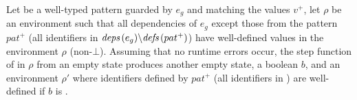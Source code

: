 \begin{lemma}
    \label{lem:semantics:grsync:theorems:productivity:patterns}
    Let  be a well-typed \GRSync pattern guarded by $e_g$ and matching the
    values $v^+$, let $\rho$ be an environment such that all dependencies of $e_g$ except those from
    the pattern $pat^+$ (\ie all identifiers in ${\textit{deps}\left(e_g\right)} \backslash {\ensuremath{\textit{defs}\left(pat^+\right)}}$) have
    well-defined values in the environment $\rho$ (non-$\bot$).
    Assuming that no runtime errors occur, the step function of  in $\rho$
    from an empty state produces another empty state, a boolean $b$, and an environment $\rho'$
    where identifiers defined by $pat^+$ (\ie all identifiers in ) are well-defined if
    $b$ is \true.
\end{lemma}
